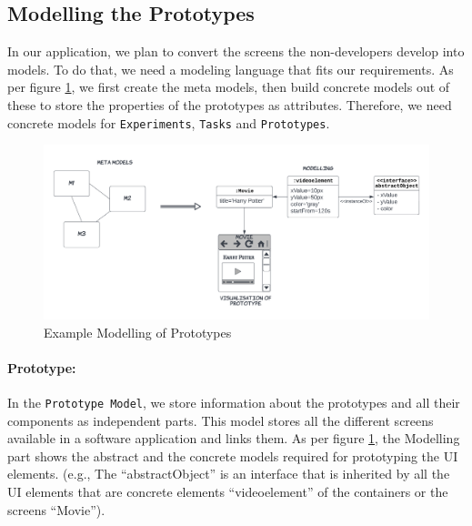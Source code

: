 \subsection{Modelling the Prototypes}
\label{solutionideas:subsection:modelling}

In our application, we plan to convert the screens the non-developers develop into models. 
To do that, we need a modeling language that fits our requirements. As per figure \ref{solutionideas:fig:metamodel}, we first create the meta models, then build concrete models out of these to store the properties of the prototypes as attributes.
Therefore, we need concrete models for \texttt{Experiments}, \texttt{Tasks} and \texttt{Prototypes}.

\begin{figure}[bt]
	\centering
  \includegraphics[width=1.05\textwidth]{images/solution-ideas/MetaModel.png}
	\caption{Example Modelling of Prototypes}
	\label{solutionideas:fig:metamodel}
\end{figure}

\paragraph{Prototype:} In the \texttt{Prototype Model}, we store information about the prototypes and all their components as independent parts.
This model stores all the different screens available in a software application and links them.
As per figure \ref{solutionideas:fig:metamodel}, the Modelling part shows the abstract and the concrete models required for prototyping the UI elements. 
(e.g., The ``abstractObject'' is an interface that is inherited by all the UI elements that are concrete elements ``videoelement'' of the containers or the screens ``Movie'').

